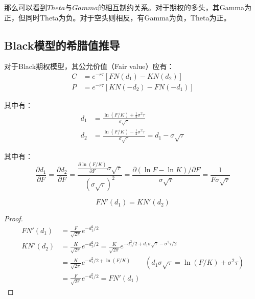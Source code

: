\documentclass[11pt]{article}
\begin{document}
那么可以看到$Theta$与$Gamma$的相互制约关系。对于期权的多头，其Gamma为正，但同时Theta为负。对于空头则相反，有Gamma为负，Theta为正。

\subsection{Black模型的希腊值推导}

对于Black期权模型，其公允价值（Fair value）应有：
\begin{align*}
    C &= e^{-r\tau}\left[FN(d_1) - KN(d_2)\right] \\
    P &= e^{-r\tau}\left[KN(-d_2) - FN(-d_1)\right]
\end{align*}

其中有：
\begin{align*}
    d_1 &= \frac{\ln(F/K) + \frac{1}{2} \sigma^2 \tau}{\sigma \sqrt{\tau}} \\
    d_2 &= \frac{\ln(F/K) - \frac{1}{2} \sigma^2 \tau}{\sigma \sqrt{\tau}}
    = d_1 - \sigma \sqrt{\tau}
\end{align*}

其中有：
\begin{equation*}
    \frac{\partial d_1}{\partial F} = \frac{\partial d_2}{\partial F} = \frac{\frac{\partial \ln(F/K)}{\partial F} \sigma \sqrt{\tau}}{(\sigma \sqrt{\tau})^2} = \frac{\partial (\ln F - \ln K)/\partial F}{\sigma\sqrt{\tau}} = \frac{1}{F\sigma\sqrt{\tau}}
\end{equation*}

\begin{lemma}
    \begin{equation*}
        F N'(d_1) = K N'(d_2)
    \end{equation*}
\end{lemma}

\begin{proof}
    \begin{align*}
        FN'(d_1) &= \frac{F}{\sqrt{2\pi}}e^{-d_1^2/2} \\
        KN'(d_2) &= \frac{K}{\sqrt{2\pi}}e^{-d_2^2/2} = \frac{K}{\sqrt{2\pi}}e^{-d_1^2/2+d_1\sigma\sqrt{\tau}-\sigma^2\tau/2} \\
        &= \frac{K}{\sqrt{2\pi}}e^{-d_1^2/2+\ln(F/K)} 
        \qquad \left(d_1\sigma\sqrt{\tau} = \ln(F/K)+\sigma^2\tau\right) \\
        &= \frac{F}{\sqrt{2\pi}}e^{-d_1^2/2} = FN'(d_1)
    \end{align*}
\end{proof}
\end{document}
